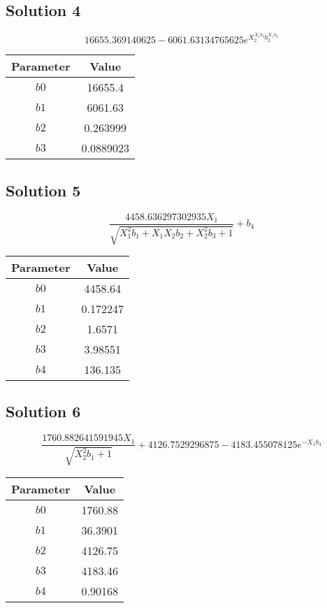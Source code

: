\documentclass{article}
\begin{document}
\vspace{1em}
\subsection*{Solution 4}
\[
16655.369140625 - 6061.63134765625 e^{X_{2}^{X_{1} b_{3}} b_{2}^{X_{1} b_{3}}}
\]
\begin{center}
\begin{tabular}{cc}
\toprule
Parameter & Value \\
\midrule
$b0$ & 16655.4 \\
$b1$ & 6061.63 \\
$b2$ & 0.263999 \\
$b3$ & 0.0889023 \\
\bottomrule
\end{tabular}
\end{center}

\vspace{1em}
\subsection*{Solution 5}
\[
\frac{4458.636297302935 X_{1}}{\sqrt{X_{1}^{2} b_{1} + X_{1} X_{2} b_{2} + X_{2}^{2} b_{3} + 1}} + b_{4}
\]
\begin{center}
\begin{tabular}{cc}
\toprule
Parameter & Value \\
\midrule
$b0$ & 4458.64 \\
$b1$ & 0.172247 \\
$b2$ & 1.6571 \\
$b3$ & 3.98551 \\
$b4$ & 136.135 \\
\bottomrule
\end{tabular}
\end{center}

\vspace{1em}
\subsection*{Solution 6}
\[
\frac{1760.882641591945 X_{1}}{\sqrt{X_{2}^{2} b_{1} + 1}} + 4126.7529296875 - 4183.455078125 e^{- X_{1} b_{4}}
\]
\begin{center}
\begin{tabular}{cc}
\toprule
Parameter & Value \\
\midrule
$b0$ & 1760.88 \\
$b1$ & 36.3901 \\
$b2$ & 4126.75 \\
$b3$ & 4183.46 \\
$b4$ & 0.90168 \\
\bottomrule
\end{tabular}
\end{center}
\end{document}
